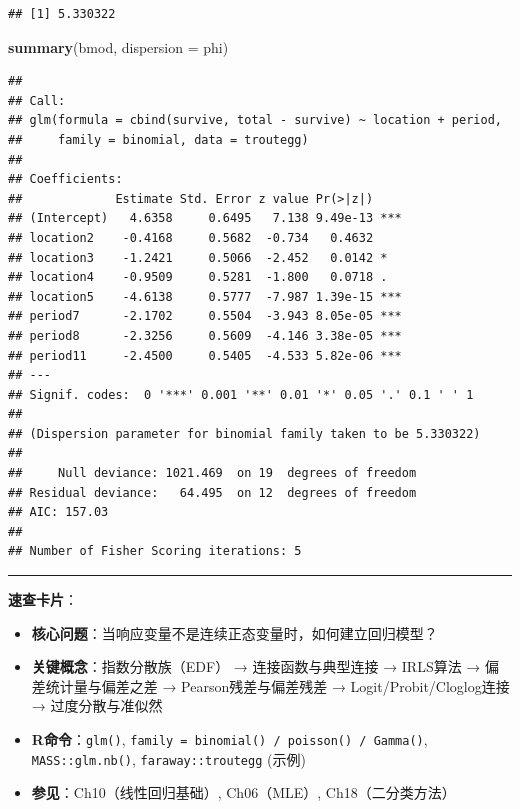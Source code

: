 \documentclass[
]{book}
\newenvironment{Shaded}{\begin{snugshade}}{\end{snugshade}}
\newcommand{\AttributeTok}[1]{\textcolor[rgb]{0.13,0.29,0.53}{#1}}
\newcommand{\FunctionTok}[1]{\textcolor[rgb]{0.13,0.29,0.53}{\textbf{#1}}}
\newcommand{\NormalTok}[1]{#1}
\providecommand{\tightlist}{%
  \setlength{\itemsep}{0pt}\setlength{\parskip}{0pt}}
\begin{document}
\begin{verbatim}
## [1] 5.330322
\end{verbatim}

\begin{Shaded}
\begin{Highlighting}[]
\FunctionTok{summary}\NormalTok{(bmod, }\AttributeTok{dispersion =}\NormalTok{ phi)}
\end{Highlighting}
\end{Shaded}

\begin{verbatim}
## 
## Call:
## glm(formula = cbind(survive, total - survive) ~ location + period, 
##     family = binomial, data = troutegg)
## 
## Coefficients:
##             Estimate Std. Error z value Pr(>|z|)    
## (Intercept)   4.6358     0.6495   7.138 9.49e-13 ***
## location2    -0.4168     0.5682  -0.734   0.4632    
## location3    -1.2421     0.5066  -2.452   0.0142 *  
## location4    -0.9509     0.5281  -1.800   0.0718 .  
## location5    -4.6138     0.5777  -7.987 1.39e-15 ***
## period7      -2.1702     0.5504  -3.943 8.05e-05 ***
## period8      -2.3256     0.5609  -4.146 3.38e-05 ***
## period11     -2.4500     0.5405  -4.533 5.82e-06 ***
## ---
## Signif. codes:  0 '***' 0.001 '**' 0.01 '*' 0.05 '.' 0.1 ' ' 1
## 
## (Dispersion parameter for binomial family taken to be 5.330322)
## 
##     Null deviance: 1021.469  on 19  degrees of freedom
## Residual deviance:   64.495  on 12  degrees of freedom
## AIC: 157.03
## 
## Number of Fisher Scoring iterations: 5
\end{verbatim}

\begin{center}\rule{0.5\linewidth}{0.5pt}\end{center}

\textbf{速查卡片}：

\begin{itemize}
\tightlist
\item
  \textbf{核心问题}：当响应变量不是连续正态变量时，如何建立回归模型？
\item
  \textbf{关键概念}：指数分散族（EDF） → 连接函数与典型连接 → IRLS算法 → 偏差统计量与偏差之差 → Pearson残差与偏差残差 → Logit/Probit/Cloglog连接 → 过度分散与准似然
\item
  \textbf{R命令}：\texttt{glm()}, \texttt{family\ =\ binomial()\ /\ poisson()\ /\ Gamma()}, \texttt{MASS::glm.nb()}, \texttt{faraway::troutegg} (示例)
\item
  \textbf{参见}：Ch10（线性回归基础）, Ch06（MLE）, Ch18（二分类方法）
\end{itemize}
\end{document}
